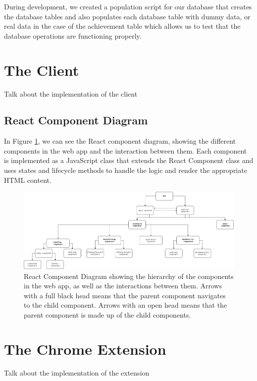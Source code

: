 \documentclass{l4proj}
\begin{document}
During development, we created a population script for our database that creates the database tables and also populates each database table with dummy data, or real data in the case of the achievement table which allows us to test that the database operations are functioning properly. 

\section{The Client}
Talk about the implementation of the client

\subsection{React Component Diagram}
In Figure \ref{fig:react}, we can see the React component diagram, showing the different components in the web app and the interaction between them. Each component is implemented as a JavaScript class that extends the React Component class and uses states and lifecycle methods to handle the logic and render the appropriate HTML content. 
\begin{figure}
    \centering
    \includegraphics[width=1\linewidth]{images/react_comp_diagram.png}    

    \caption{React Component Diagram showing the hierarchy of the components in the web app, as well as the interactions between them. Arrows with a full black head means that the parent component navigates to the child component. Arrows with an open head means that the parent component is made up of the child components.}

    \label{fig:react} 
\end{figure}

\subsection{}

\section{The Chrome Extension}
Talk about the implementation of the extension
\end{document}
